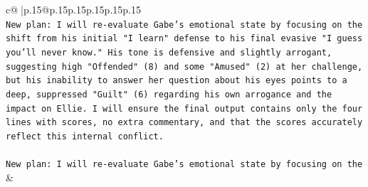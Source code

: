 \documentclass{article}
\begin{document}
{\begin{supertabular}{c@{$\;$}|p{.15\linewidth}@{}p{.15\linewidth}p{.15\linewidth}p{.15\linewidth}p{.15\linewidth}p{.15\linewidth}}
{{{\\ 
\texttt{New plan: I will re{-}evaluate Gabe's emotional state by focusing on the shift from his initial "I learn" defense to his final evasive "I guess you'll never know." His tone is defensive and slightly arrogant, suggesting high "Offended" (8) and some "Amused" (2) at her challenge, but his inability to answer her question about his eyes points to a deep, suppressed "Guilt" (6) regarding his own arrogance and the impact on Ellie. I will ensure the final output contains only the four lines with scores, no extra commentary, and that the scores accurately reflect this internal conflict.} \\
\\ 
\texttt{New plan: I will re{-}evaluate Gabe's emotional state by focusing on the} \\
            }
        }
    }
    & \\ \\

\end{supertabular}
}
\end{document}
